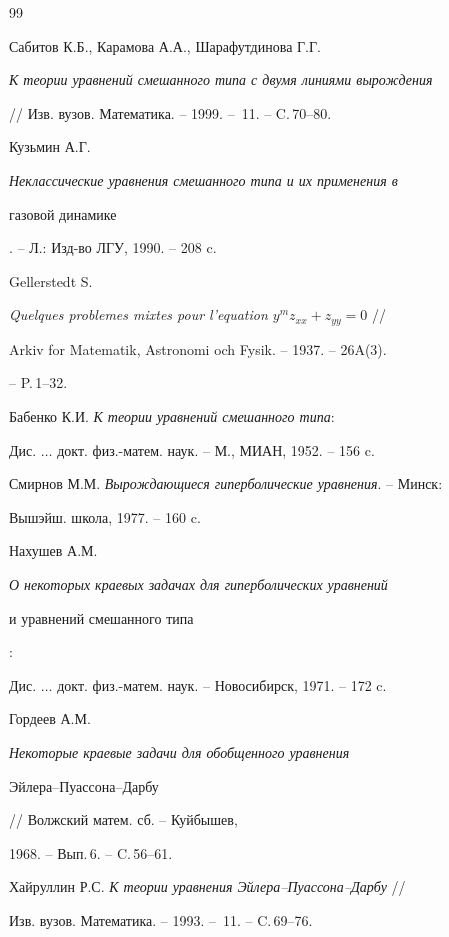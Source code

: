 \begin{thebibliography}{99}







Сабитов К.Б., Карамова А.А., Шарафутдинова Г.Г. 


{\em К теории уравнений смешанного типа с двумя линиями вырождения}


// Изв. вузов. Математика. -- 1999. -- \No\,11. -- C.\,70--80.




Кузьмин А.Г. {\em Неклассические уравнения смешанного типа и их применения в 


газовой динамике}. -- Л.: Изд-во ЛГУ, 1990. -- 208 c.




Gellerstedt S. 


{\em Quelques problemes mixtes pour l'equation $y^mz_{xx}+z_{yy}=0$} //


Arkiv for Matematik, Astronomi och Fysik. -- 1937. -- 26A\;(3).


-- P.\,1--32.




Бабенко К.И. {\em К теории уравнений смешанного типа}:  


Дис. $\dotsc$ докт. физ.-матем. наук. -- М., МИАН, 1952. -- 156 c.




Смирнов М.М. {\em Вырождающиеся гиперболические уравнения}. -- Минск:


Вышэйш. школа, 1977. -- 160 c.




Нахушев А.М. {\em О некоторых краевых задачах для гиперболических уравнений


и уравнений смешанного типа}: 


Дис. $\dotsc$ докт. физ.-матем. наук. -- Новосибирск, 1971. -- 172 c.




Гордеев А.М. {\em Некоторые краевые задачи для обобщенного уравнения 


Эйлера--Пуассона--Дарбу} // Волжский матем. сб. -- Куйбышев,


1968. -- Вып.\,6. -- C.\,56--61.




Хайруллин Р.С. {\em К теории уравнения Эйлера--Пуассона--Дарбу} // 


Изв. вузов. Математика. -- 1993. -- \No\,11. -- C.\,69--76.



\end{thebibliography}
